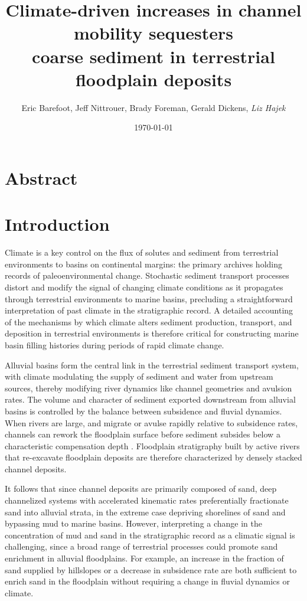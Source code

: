 \documentclass[draft]{compact_proposal}\usepackage[]{graphicx}\usepackage[]{color}
\title{Climate-driven increases in channel mobility sequesters \\ coarse sediment in terrestrial floodplain deposits}
\author{Eric Barefoot, Jeff Nittrouer, Brady Foreman, Gerald Dickens, \textit{Liz Hajek}}
\date{\today}
\begin{document}
\maketitle





\section{Abstract}

\section{Introduction}

Climate is a key control on the flux of solutes and sediment from terrestrial environments to basins on continental margins: the primary archives holding records of paleoenvironmental change.
Stochastic sediment transport processes distort and modify the signal of changing climate conditions as it propagates through terrestrial environments to marine basins, precluding a straightforward interpretation of past climate in the stratigraphic record.
A detailed accounting of the mechanisms by which climate alters sediment production, transport, and deposition in terrestrial environments is therefore critical for constructing marine basin filling histories during periods of rapid climate change.

Alluvial basins form the central link in the terrestrial sediment transport system, with climate modulating the supply of sediment and water from upstream sources, thereby modifying river dynamics like channel geometries and avulsion rates. 
The volume and character of sediment exported downstream from alluvial basins is controlled by the balance between subsidence and fluvial dynamics.
When rivers are large, and migrate or avulse rapidly relative to subsidence rates, channels can rework the floodplain surface before sediment subsides below a characteristic compensation depth \cnote.
Floodplain stratigraphy built by active rivers that re-excavate floodplain deposits are therefore characterized by densely stacked channel deposits.

It follows that since channel deposits are primarily composed of sand, deep channelized systems with accelerated kinematic rates preferentially fractionate sand into alluvial strata, in the extreme case depriving shorelines of sand and bypassing mud to marine basins.
However, interpreting a change in the concentration of mud and sand in the stratigraphic record as a climatic signal is challenging, since a broad range of terrestrial processes could promote sand enrichment in alluvial floodplains.
For example, an increase in the fraction of sand supplied by hillslopes or a decrease in subsidence rate are both sufficient to enrich sand in the floodplain without requiring a change in fluvial dynamics or climate.
\end{document}
